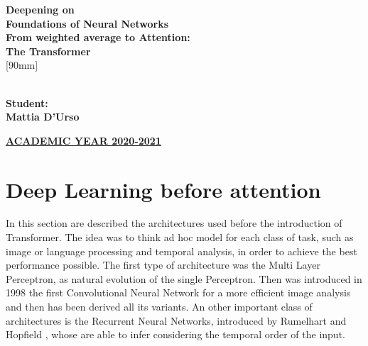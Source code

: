 \documentclass[11pt]{article}
\begin{document}

\begin{titlepage}
 	\centering
  \Huge{\textbf{Deepening on \\ Foundations of Neural Networks}}\\ 
  [25mm]
  \Huge{\textbf{From weighted average to Attention: \\ The Transformer}}\\
 	[90mm]
  \raggedright
   \Large{\textbf{}}\\
  \Large{\textbf{Student:}}\\
  \Large{\textbf{Mattia D'Urso}}\\
 	[35mm]
  \raggedright
 	\centering
   \LARGE{\underline{\textbf{ACADEMIC YEAR 2020-2021}}}\\
\end{titlepage}

\tableofcontents
\thispagestyle{empty}
\cleardoublepage


\section{Deep Learning before attention}   %
In this section are described the architectures used before the introduction of Transformer. The idea was to think ad hoc model for each class of task, such as image or language processing and temporal analysis, in order to achieve the best performance possible. The first type of architecture was the Multi Layer Perceptron, as natural evolution of the single Perceptron. Then was introduced in 1998 the first Convolutional Neural Network \cite{lenet} for a more efficient image analysis and then has been derived all its variants. An other important class of architectures is the Recurrent Neural Networks, introduced by Rumelhart\cite{rume} and Hopfield \cite{hopfield}, whose are able to infer considering the temporal order of the input. 
\end{document}
